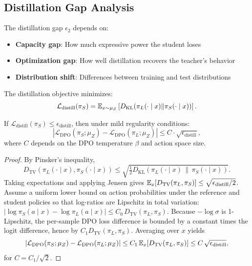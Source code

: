 \subsection{Distillation Gap Analysis}

The distillation gap $\epsilon_2$ depends on:
\begin{itemize}[nosep]
    \item \textbf{Capacity gap}: How much expressive power the student loses
    \item \textbf{Optimization gap}: How well distillation recovers the teacher's behavior
    \item \textbf{Distribution shift}: Differences between training and test distributions
\end{itemize}

\begin{definition}
The distillation objective minimizes:
\[
\mathcal{L}_{\text{distill}}(\pi_S) = \mathbb{E}_{x \sim \mu_Z} \left[ D_{\text{KL}}(\pi_L(\cdot \mid x) \| \pi_S(\cdot \mid x)) \right].
\]
\end{definition}

\begin{theorem}
If $\mathcal{L}_{\text{distill}}(\pi_S) \le \epsilon_{\text{distill}}$, then under mild regularity conditions:
\[
|\mathcal{L}_{\text{DPO}}(\pi_S; \mu_Z) - \mathcal{L}_{\text{DPO}}(\pi_L; \mu_Z)| \le C \cdot \sqrt{\epsilon_{\text{distill}}},
\]
where $C$ depends on the DPO temperature $\beta$ and action space size.
\end{theorem}

\begin{proof}
By Pinsker's inequality,
\[
D_{\text{TV}}(\pi_L(\cdot\mid x),\pi_S(\cdot\mid x))
\le \sqrt{\tfrac12 D_{\text{KL}}(\pi_L(\cdot\mid x)\,\|\,\pi_S(\cdot\mid x))}.
\]
Taking expectations and applying Jensen gives
$\mathbb{E}_x[D_{\text{TV}}(\pi_L,\pi_S)]\le \sqrt{\epsilon_{\text{distill}}/2}$.
Assume a uniform lower bound on action probabilities under the reference and student policies so that log-ratios are Lipschitz in total variation:
$
|\log \pi_S(a\mid x)-\log \pi_L(a\mid x)|\le C_0\,D_{\text{TV}}(\pi_L,\pi_S).
$
Because $-\log\sigma$ is 1-Lipschitz, the per-sample DPO loss difference is bounded by a constant times the logit difference, hence by $C_1 D_{\text{TV}}(\pi_L,\pi_S)$. Averaging over $x$ yields
\[
|\mathcal{L}_{\text{DPO}}(\pi_S;\mu_Z)-\mathcal{L}_{\text{DPO}}(\pi_L;\mu_Z)|
\le C_1\,\mathbb{E}_x[D_{\text{TV}}(\pi_L,\pi_S)]
\le C\,\sqrt{\epsilon_{\text{distill}}},
\]
for $C=C_1/\sqrt{2}$.
\end{proof}

